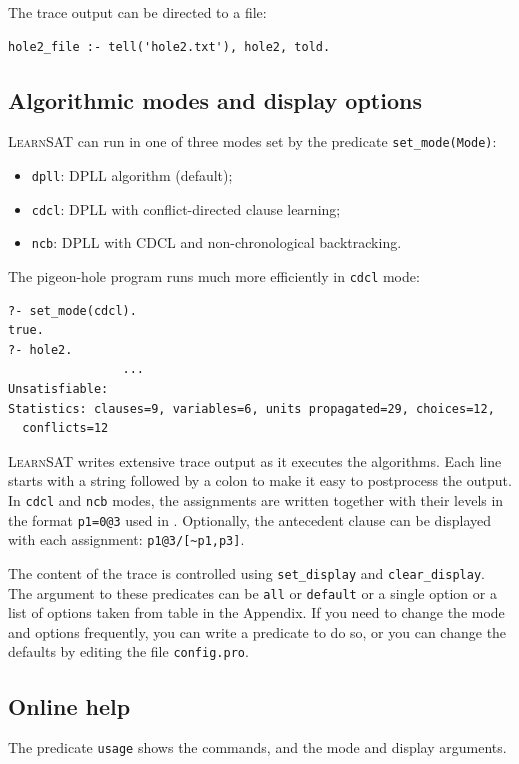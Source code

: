 \documentclass[11pt]{article}
\newcommand*{\p}[1]{\textup{\texttt{#1}}}
\newcommand*{\ls}{\textsc{LearnSAT}}
\begin{document}
The trace output can be directed to a file:

\begin{verbatim}
hole2_file :- tell('hole2.txt'), hole2, told.
\end{verbatim}

\subsection{Algorithmic modes and display options}

\ls{} can run in one of three modes set by the predicate \p{set\_mode(Mode)}:
\begin{itemize}
\item \p{dpll}: DPLL algorithm (default);
\item \p{cdcl}: DPLL with conflict-directed clause learning;
\item \p{ncb}:  DPLL with CDCL and non-chronological backtracking.
\end{itemize}

The pigeon-hole program runs much more efficiently in \p{cdcl} mode:
\begin{verbatim}
?- set_mode(cdcl).
true.
?- hole2.
                ...
Unsatisfiable:
Statistics: clauses=9, variables=6, units propagated=29, choices=12,
  conflicts=12
\end{verbatim}

\ls{} writes extensive trace output as it executes the algorithms. Each
line starts with a string followed by a colon to make it easy to
postprocess the output. In \p{cdcl} and \p{ncb} modes, the assignments
are written together with their levels in the format \p{p1=0@3} used in
\cite{mlm}. Optionally, the antecedent clause can be displayed with each
assignment: \verb+p1@3/[~p1,p3]+.

The content of the trace is controlled using \p{set\_display} and
\p{clear\_display}. The argument to these predicates can be \p{all} or
\p{default} or a single option or a list of options taken from table in
the Appendix. If you need to change the mode and options frequently, you
can write a predicate to do so, or you can change the defaults by
editing the file \p{config.pro}.

\subsection{Online help}

The predicate \p{usage} shows the commands, and the mode and display
arguments.
\end{document}
